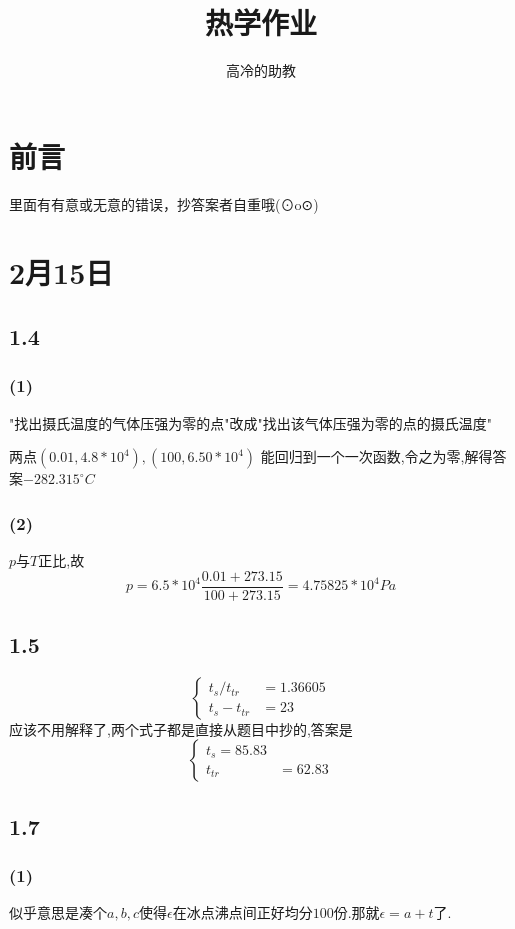 \documentclass{article}
\title{热学作业}
\author{高冷的助教}
\begin{document}
\maketitle
\section*{前言}
里面有有意或无意的错误，抄答案者自重哦(⊙o⊙)
\section{2月15日}
\subsection*{1.4}
\subsubsection*{(1)}
"找出摄氏温度的气体压强为零的点"改成"找出该气体压强为零的点的摄氏温度"

两点$(0.01, 4.8*10^4), (100, 6.50*10^4)$
能回归到一个一次函数,令之为零,解得答案$-282.315^{\circ}C$

\subsubsection*{(2)}
$p$与$T$正比,故
\begin{equation}
p=6.5*10^4 \frac{0.01 + 273.15}{100 + 273.15}=4.75825*10^4 Pa
\end{equation}
\subsection*{1.5}
\begin{equation}
	\left\{\begin{aligned}
	t_s/t_{tr}&=1.36605\\
	t_s-t_{tr}&=23
	\end{aligned}\right.
\end{equation}
应该不用解释了,两个式子都是直接从题目中抄的,答案是
\begin{equation}
\left\{\begin{aligned}
t_s = 85.83\\
t_{tr}&=62.83
\end{aligned}\right.
\end{equation}
\subsection*{1.7}
\subsubsection*{(1)}
似乎意思是凑个$a,b,c$使得$\epsilon$在冰点沸点间正好均分$100$份.那就$\epsilon=a+t$了.
\end{document}

